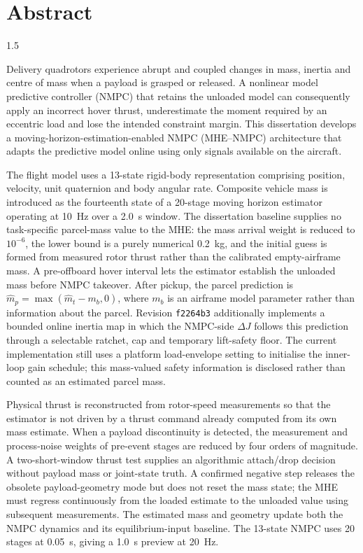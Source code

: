 \newpage
\chapter*{\centering Abstract}

\begin{spacing}{1.5}
\setlength{\parskip}{0.18in}

Delivery quadrotors experience abrupt and coupled changes in mass, inertia and centre of mass when a payload is grasped or released. A nonlinear model predictive controller (NMPC) that retains the unloaded model can consequently apply an incorrect hover thrust, underestimate the moment required by an eccentric load and lose the intended constraint margin. This dissertation develops a moving-horizon-estimation-enabled NMPC (MHE--NMPC) architecture that adapts the predictive model online using only signals available on the aircraft.

The flight model uses a 13-state rigid-body representation comprising position, velocity, unit quaternion and body angular rate. Composite vehicle mass is introduced as the fourteenth state of a 20-stage moving horizon estimator operating at \SI{10}{Hz} over a \SI{2.0}{s} window. The dissertation baseline supplies no task-specific parcel-mass value to the MHE: the mass arrival weight is reduced to $10^{-6}$, the lower bound is a purely numerical \SI{0.2}{kg}, and the initial guess is formed from measured rotor thrust rather than the calibrated empty-airframe mass. A pre-offboard hover interval lets the estimator establish the unloaded mass before NMPC takeover. After pickup, the parcel prediction is \(\hat m_p=\max(\hat m_t-m_b,0)\), where $m_b$ is an airframe model parameter rather than information about the parcel. Revision \texttt{f2264b3} additionally implements a bounded online inertia map in which the NMPC-side $\Delta J$ follows this prediction through a selectable ratchet, cap and temporary lift-safety floor. The current implementation still uses a platform load-envelope setting to initialise the inner-loop gain schedule; this mass-valued safety information is disclosed rather than counted as an estimated parcel mass.

Physical thrust is reconstructed from rotor-speed measurements so that the estimator is not driven by a thrust command already computed from its own mass estimate. When a payload discontinuity is detected, the measurement and process-noise weights of pre-event stages are reduced by four orders of magnitude. A two-short-window thrust test supplies an algorithmic attach/drop decision without payload mass or joint-state truth. A confirmed negative step releases the obsolete payload-geometry mode but does not reset the mass state; the MHE must regress continuously from the loaded estimate to the unloaded value using subsequent measurements. The estimated mass and geometry update both the NMPC dynamics and its equilibrium-input baseline. The 13-state NMPC uses 20 stages at \SI{0.05}{s}, giving a \SI{1.0}{s} preview at \SI{20}{Hz}.


\end{spacing}
